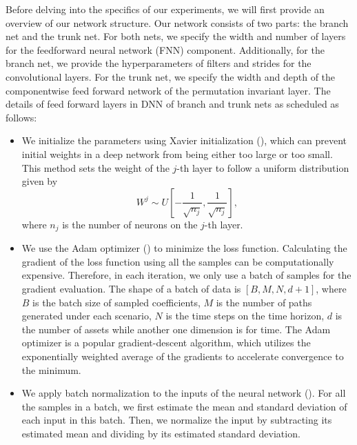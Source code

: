 \documentclass[11pt,a4paper]{article}
\theoremstyle{remark}
\begin{document}
	
	Before delving into the specifics of our experiments, we will first provide an overview of our network structure. Our network consists of two parts: the branch net and the trunk net. For both nets, we specify the width and number of layers for the feedforward neural network (FNN) component. Additionally, for the branch net, we provide the hyperparameters of filters and strides for the convolutional layers. For the trunk net, we specify the width and depth of the componentwise feed forward network of the permutation invariant layer. The details of feed forward layers in DNN of branch and trunk nets as scheduled as follows:
	\begin{itemize}
		\item We initialize the parameters using Xavier initialization (\cite{glorot2010understanding}), which can prevent initial weights in a deep network from being either too large or too small. This method sets the weight of the $j$-th layer to follow a uniform distribution given by 
		\begin{equation}	
			W^{j} \sim U\left[-\frac{1}{\sqrt{n_{j}}}, \frac{1}{\sqrt{n_{j}}}\right], 
		\end{equation}
		where $n_j$ is the number of neurons on the $j$-th layer. 
		
		\item We use the Adam optimizer (\cite{kingma2014adam}) to minimize the loss function.  Calculating the gradient of the loss function using all the samples can be computationally expensive. Therefore, in each iteration, we only use a batch of samples for the gradient evaluation. The shape of a batch of data is $[B, M, N, d+1]$, where $B$ is the batch size of sampled coefficients, $M$ is the number of paths generated under each scenario, $N$ is the time steps on the time horizon, $d$ is the number of assets while another one dimension is for time. The Adam optimizer is a popular gradient-descent algorithm, which utilizes the exponentially weighted average of the gradients to accelerate convergence to the minimum. 
		
		\item We apply batch normalization to the inputs of the neural network (\cite{ioffe2015batch}). For all the samples in a batch, we first estimate the mean and standard deviation of each input in this batch. Then, we normalize the input by subtracting its estimated mean and dividing by its estimated standard deviation. 
		
	\end{itemize}
	
\end{document}
